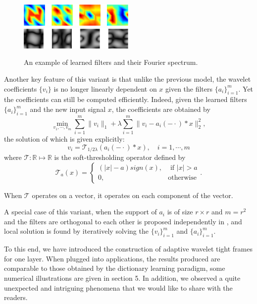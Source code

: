 \documentclass[a4paper]{article}
\begin{document}
\begin{figure}[h!]
    \centering
    \includegraphics[width=0.5\textwidth]{fig11.eps}
  \includegraphics[width=0.5\textwidth]{fig12.eps}
    \caption{An example of learned filters and their Fourier spectrum.}
    \label{fig:1}
\end{figure}
Another key feature of this variant  is that unlike the previous model, the wavelet coefficients $\{v_i\}$ is no longer linearly dependent on $x$ given the filters $\{a_i\}_{i=1}^m$. Yet the coefficients can still be computed efficiently. Indeed, given the learned filters $\{a_i\}_{i=1}^m$ and the new input signal $x$, the coefficients are obtained by 
\[
\min_{v_1,\cdots,v_m} \sum_{i=1}^m \|v_i\|_1 + \lambda \sum_{i=1}^m \|v_i - a_i(-\cdot)*x\|_2^2,
\]
the solution of which is given explicitly:
\[
v_i = \mathcal{T}_{1/2\lambda}( a_i(-\cdot)*x),\quad i=1,\cdots,m
\]
where $\mathcal{T}: \mathbb{R}\mapsto \mathbb{R}$ is the soft-thresholding operator defined by
\begin{equation}
\label{eq:soft}
\mathcal{T}_a(x)=\left\{ \begin{array}{lr}  (|x|-a)sign(x), &\textrm{ if } |x| > a \\0, &\textrm{otherwise}\end{array}\right . .
\end{equation}

When $\mathcal{T}$ operates on a vector, it operates on each component of the vector.


A special case of this variant, when the support of $a_i$ is of size $r\times r$ and $m=r^2$ and the filters are orthogonal to each other is proposed independently in \cite{cai2014data}, and local solution is found by iteratively solving the $\{v_i\}_{i=1}^m$ and $\{a_i\}_{i=1}^m$.

To this end, we have introduced the construction of adaptive wavelet tight frames for one layer. When plugged into applications, the results produced are comparable to those obtained by the dictionary learning paradigm, some numerical illustrations are given in section 5. In addition, we observed a quite unexpected and intriguing phenomena that we would like to share with the readers.
\end{document}
